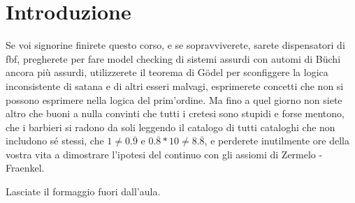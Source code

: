 
\chapter{Introduzione}

\label{cap:introduction}



Se voi signorine finirete questo corso, e se sopravviverete, sarete
dispensatori di fbf, pregherete per fare model checking di sistemi
assurdi con automi di Büchi ancora più assurdi, utilizzerete il teorema
di Gödel per sconfiggere la logica inconsistente di satana e di altri
esseri malvagi, esprimerete concetti che non si possono esprimere
nella logica del prim'ordine. Ma fino a quel giorno non siete altro
che buoni a nulla convinti che tutti i cretesi sono stupidi e forse
mentono, che i barbieri si radono da soli leggendo il catalogo di
tutti cataloghi che non includono sé stessi, che $1\neq0.\overline{9}$
e $0.\overline{8}*10\neq8.\overline{8}$, e perderete inutilmente
ore della vostra vita a dimostrare l'ipotesi del continuo con gli
assiomi di Zermelo - Fraenkel.

Lasciate il formaggio fuori dall'aula. \\

